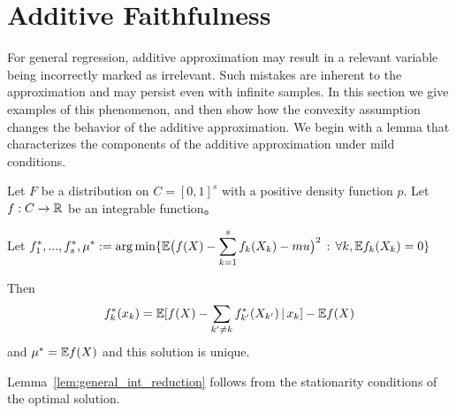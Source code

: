 
\section{Additive Faithfulness}

For general regression, additive approximation may result in a
relevant variable being incorrectly marked as irrelevant. Such
mistakes are inherent to the approximation and may persist even with
infinite samples.  In this section we give
examples of this phenomenon, and then show how the convexity
assumption
changes the behavior of the additive approximation. We begin
with a lemma that characterizes the components of the additive approximation under mild conditions.




\begin{lemma}
\label{lem:general_int_reduction}
Let $F$ be a distribution on $C=[0,1]^s$ with a positive density function $p$. Let $f: C \rightarrow {\mathbb R}$ be an integrable function。

Let $\displaystyle f^*_1,...,f^*_s, \mu^* := 
\arg\min \{ {\mathbb E} \big( f(X) - \sum_{k=1}^s f_k(X_k) - mu \big)^2 \,:\, \forall k, {\mathbb E} f_k(X_k) = 0\}$ 

Then 
$$ f^*_k(x_k) = {\mathbb E}[ f(X) - \sum_{k' \neq k} f^*_{k'}(X_{k'}) {\,|\,} x_k] - {\mathbb E} f(X) $$
 and $\mu^* = {\mathbb E} f(X)$ and this solution is unique.
\end{lemma}


Lemma~\ref{lem:general_int_reduction} follows from the stationarity
conditions of the optimal solution. 

